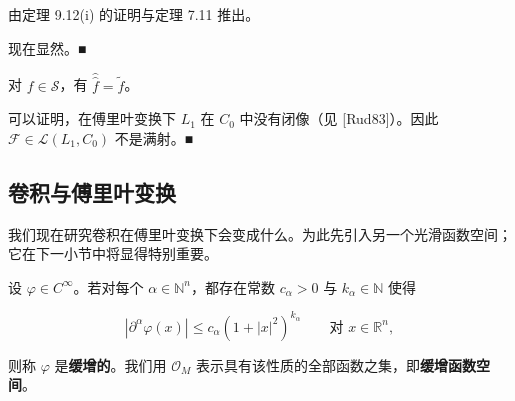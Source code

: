 \begin{corollary}
\begin{subitems}
\item[（iii）]

由定理 9.12(i) 的证明与定理 7.11 推出。

\item[（iv）]

现在显然。\nobreak\hspace{0.35em}■

\end{subitems}

\end{corollary}

\begin{remark}

\begin{items}
\item

对 $ f \in \mathcal{S} $，有 $ \widehat{\widehat{f}} = \widetilde{f} $。

\item

可以证明，在傅里叶变换下 $ L_1 $ 在 $ C_0 $ 中没有闭像（见 [Rud83]）。因此 $ \mathcal{F} \in \mathcal{L}(L_1,C_0) $ 不是满射。\nobreak\hspace{0.35em}■

\end{items}

\end{remark}

\subsection*{卷积与傅里叶变换}

我们现在研究卷积在傅里叶变换下会变成什么。为此先引入另一个光滑函数空间；它在下一小节中将显得特别重要。

设 $ \varphi \in C^\infty $。若对每个 $ \alpha \in \mathbb{N}^n $，都存在常数 $ c_\alpha > 0 $ 与 $ k_\alpha \in \mathbb{N} $ 使得

\[
|\partial^\alpha\varphi(x)| \le c_\alpha(1+|x|^2)^{k_\alpha} \qquad \text{对 } x \in \mathbb{R}^n ,
\]

则称 $ \varphi $ 是\textbf{缓增的}。我们用 $ \mathcal{O}_M $ 表示具有该性质的全部函数之集，即\textbf{缓增函数空间}。

